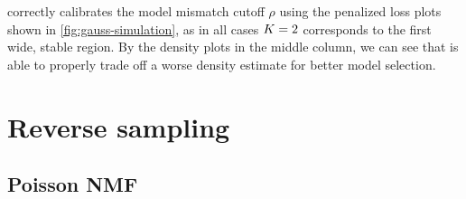 \methodname correctly calibrates the model mismatch cutoff $\rho$ using the penalized loss plots shown in \cref{fig:gauss-simulation},
as in all cases $K = 2$ corresponds to the first wide, stable region.
By the density plots in the middle column, we can see that \methodname 
is able to properly trade off a worse density estimate for better model selection.





\section{Reverse sampling}

\subsection{Poisson NMF}

